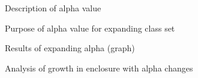 Description of alpha value

Purpose of alpha value for expanding class set

Results of expanding alpha (graph)

Analysis of growth in enclosure with alpha changes

